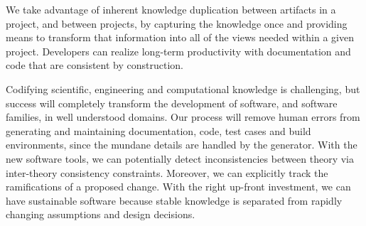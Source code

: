 \documentclass[sigconf,review,anonymous=false]{acmart}
\begin{document}
We take advantage of inherent knowledge duplication between artifacts in a
project, and between projects, by capturing the knowledge once and providing
means to transform that information into all of the views needed within a given
project.  Developers can realize long-term productivity with documentation and
code that are consistent by construction.

Codifying scientific, engineering and computational knowledge is challenging,
but success will completely transform the development of software, and software
families, in well understood domains. Our process will remove human errors from
generating and maintaining documentation, code, test cases and build
environments, since the mundane details are handled by the generator.  With the
new software tools, we can potentially detect inconsistencies between theory via
inter-theory consistency constraints. Moreover, we can explicitly track the
ramifications of a proposed change.  With the right up-front investment, we can
have sustainable software because stable knowledge is separated from rapidly
changing assumptions and design decisions.



\end{document}
